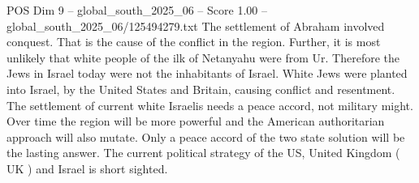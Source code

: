 \begin{textsample}{POS Dim 9 – global\_south\_2025\_06 – Score 1.00 – global\_south\_2025\_06/125494279.txt}
The settlement of Abraham involved conquest.
That is the cause of the conflict in the region.
Further, it is most unlikely that white people of the ilk of Netanyahu were from Ur.
Therefore the Jews in Israel today were not the inhabitants of Israel.
White Jews were planted into Israel, by the United States and Britain, causing conflict and resentment.
The settlement of current white Israelis needs a peace accord, not military might.
Over time the region will be more powerful and the American authoritarian approach will also mutate.
Only a peace accord of the two state solution will be the lasting answer.
The current political strategy of the US, United Kingdom ( UK ) and Israel is short sighted.

\end{textsample}
